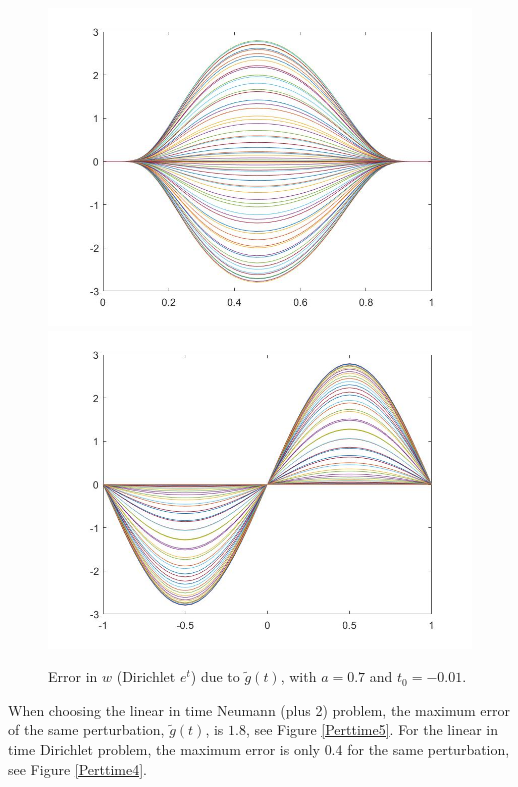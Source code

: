 \documentclass[11pt, a4paper]{article}
\theoremstyle{definition}
\begin{document}
\begin{figure}[h]
	\includegraphics[scale=0.3]{PerttimeD2.jpg}
	\includegraphics[scale=0.3]{PerttimeD1.jpg}
	\caption{Error in $w$ (Dirichlet $e^t$) due to $\tilde g(t)$, with $a =0.7$ and $t_0 = -0.01$.}
	\label{Perttime3}
\end{figure}
When choosing the linear in time Neumann (plus 2) problem, the maximum error of the same perturbation, $\tilde g(t)$, is $1.8$, see Figure \ref{Perttime5}.
For the linear in time Dirichlet problem, the maximum error is only $0.4$ for the same perturbation, see Figure \ref{Perttime4}.
\end{document}
